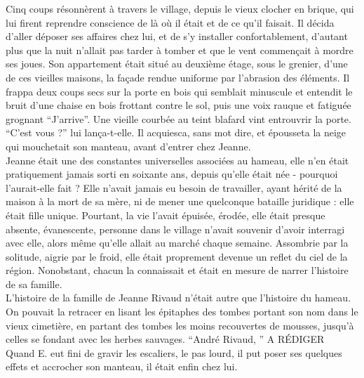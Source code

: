 \documentclass[french,amstex,12pt,a5paper]{book}
\begin{document}
Cinq coups résonnèrent à travers le village, depuis le vieux clocher en brique, qui lui firent reprendre conscience de là où il était et de ce qu'il faisait. Il décida d'aller déposer ses affaires chez lui, et de s'y installer confortablement, d'autant plus que la nuit n'allait pas tarder à tomber et que le vent commençait à mordre ses joues. Son appartement était situé au deuxième étage, sous le grenier, d'une de ces vieilles maisons, la façade rendue uniforme par l'abrasion des éléments. Il frappa deux coups secs sur la porte en bois qui semblait minuscule et entendit le bruit d'une chaise en bois frottant contre le sol, puis une voix rauque et fatiguée grognant ``J'arrive''. Une vieille courbée au teint blafard vint entrouvrir la porte. ``C'est vous ?'' lui lança-t-elle. Il acquiesca, sans mot dire, et épousseta la neige qui mouchetait son manteau, avant d'entrer chez Jeanne.\\

Jeanne était une des constantes universelles associées au hameau, elle n'en était pratiquement jamais sorti en soixante ans, depuis qu'elle était née - pourquoi l'aurait-elle fait ? Elle n'avait jamais eu besoin de travailler, ayant hérité de la maison à la mort de sa mère, ni de mener une quelconque bataille juridique : elle était fille unique. Pourtant, la vie l'avait épuisée, érodée, elle était presque absente, évanescente, personne dans le village n'avait souvenir d'avoir interragi avec elle, alors même qu'elle allait au marché chaque semaine. Assombrie par la solitude, aigrie par le froid, elle était proprement devenue un reflet du ciel de la région. Nonobstant, chacun la connaissait et était en mesure de narrer l'histoire de sa famille.\\

L'histoire de la famille de Jeanne Rivaud n'était autre que l'histoire du hameau. On pouvait la retracer en lisant les épitaphes des tombes portant son nom dans le vieux cimetière, en partant des tombes les moins recouvertes de mousses, jusqu'à celles se fondant avec les herbes sauvages. ``André Rivaud, '' A RÉDIGER \\

Quand E. eut fini de gravir les escaliers, le pas lourd, il put poser ses quelques effets et accrocher son manteau, il était enfin chez lui.

\chapter{}
\end{document}
